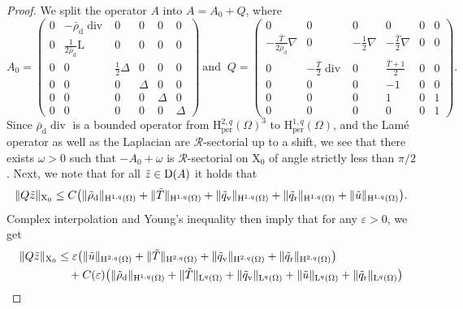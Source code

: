 \documentclass[10pt]{amsart}
\theoremstyle{plain}
\theoremstyle{definition}
\theoremstyle{thm}
\numberwithin{equation}{section}
\newcommand{\rL}{\mathrm{L}}
\newcommand{\rLq}{\rL^q}
\newcommand{\rD}{\mathrm{D}}
\newcommand{\rH}{\mathrm{H}}
\newcommand{\rX}{\mathrm{X}}
\newcommand{\cR}{\mathcal{R}}
\DeclareMathOperator{\mdiv}{div}
\newcommand{\per}{\mathrm{per}}
\newcommand{\eps}{\varepsilon}
\newcommand{\rd}{\mathrm{d}}
\newcommand{\rr}{\mathrm{r}}
\newcommand{\rv}{\mathrm{v}}
\newcommand{\trho}{\Tilde{\rho}}
\newcommand{\tu}{\Tilde{u}}
\newcommand{\tz}{\Tilde{z}}
\newcommand{\tT}{\Tilde{T}}
\newcommand{\tq}{\Tilde{q}}
\begin{document}
\begin{proof}
    We split the operator $A$ into $A = A_0 +Q$, where
    \begin{equation*}A_0=
    \begin{pmatrix}
        0 & -\bar{\rho}_\rd \mdiv & 0 & 0 & 0 & 0 \\
       0 & \frac{1}{2 \bar{\rho}_\rd}\rL & 0 & 0 & 0 & 0 \\ 0 & 0 & \frac{1}{2}\Delta & 0 & 0 & 0 \\ 0 & 0 & 0 & \Delta  & 0 & 0 \\ 0 & 0 & 0 & 0  & \Delta & 0 \\ 
       0 & 0 & 0 & 0 & 0& \Delta  
    \end{pmatrix} \ \text{and } \ Q =  \begin{pmatrix}
        0 & 0 & 0 & 0 & 0 & 0 \\
       - \frac{\bar{T}}{2 \bar{\rho}_\rd} \nabla & 0 & -\frac{1}{2} \nabla & -\frac{\bar{T}}{2} \nabla & 0 & 0 \\ 0 & -\frac{\bar{T}}{2} \mdiv & 0 &  \frac{ \bar{T}+1 }{2} & 0 & 0 \\ 0 & 0 & 0 & -1 & 0 & 0 \\ 0 & 0 & 0 & 1  & 0 & 1 \\ 
       0 & 0 & 0 & 0 & 0& 1
    \end{pmatrix} .
    \end{equation*}
    Since $\bar{\rho}_\rd \mdiv$ is a bounded operator from $\rH_\per^{2,q}(\Omega)^3$ to $\rH_\per^{1,q}(\Omega)$, and the Lam\'e operator as well as the Laplacian are $\cR$-sectorial up to a shift, we see that there exists $\omega>0$ such that $-A_0+\omega$ is $\cR$-sectorial on $\rX_0$ of angle strictly less than $\pi/2$. 
    Next, we note that for all $\tz \in \rD(A)$ it holds that
    \begin{equation*}
        \| Q \tz \|_{\rX_0} \leq C \bigl ( \| \trho_\rd \|_{\rH^{1,q}(\Omega)} +  \| \tT \|_{\rH^{1,q}(\Omega)} +  \| \tq_\rv \|_{\rH^{1,q}(\Omega)}+\| \tq_\rr \|_{\rH^{1,q}(\Omega)} + \| \tu \|_{\rH^{1,q}(\Omega)}  \bigr).
    \end{equation*}
    Complex interpolation and Young's inequality then imply that for any $\eps>0$, we get
    \begin{equation*}
        \begin{aligned}
            \| Q \tz \|_{\rX_0} &\leq \eps \bigl ( \| \tu \|_{\rH^{2,q}(\Omega)} +\| \tT \|_{\rH^{2,q}(\Omega)} + \| \tq_\rv \|_{\rH^{2,q}(\Omega)} + \|\tq_\rr\|_{\rH^{2,q}(\Omega)}   \bigr )\\ &\quad  + C(\eps) \bigl ( \| \trho_\rd \|_{\rH^{1,q}(\Omega)} +  \| \tT \|_{\rLq(\Omega)} +  \| \tq_\rv \|_{\rLq(\Omega)} + \| \tu \|_{\rLq(\Omega)} +\| \tq_\rr \|_{\rLq(\Omega)}  \bigr) \\

\end{aligned}
\end{equation*}
\end{proof}
\end{document}
